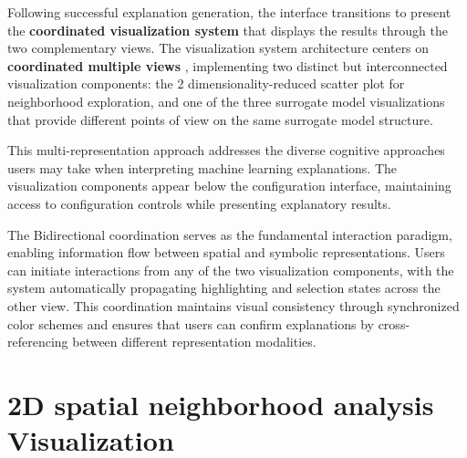 Following successful explanation generation, the interface transitions to present the \textbf{coordinated visualization system} that displays the results through the two complementary views. The visualization system architecture centers on \textbf{coordinated multiple views} \cite{readingsInformationVi}, implementing two distinct but interconnected visualization components: the 2 dimensionality-reduced scatter plot for neighborhood exploration, and one of the three surrogate model visualizations that provide different points of view on the same surrogate model structure.

This multi-representation approach addresses the diverse cognitive approaches users may take when interpreting machine learning explanations. The visualization components appear below the configuration interface, maintaining access to configuration controls while presenting explanatory results.

The Bidirectional coordination serves as the fundamental interaction paradigm, enabling information flow between spatial and symbolic representations. Users can initiate interactions from any of the two visualization components, with the system automatically propagating highlighting and selection states across the other view. This coordination maintains visual consistency through synchronized color schemes and ensures that users can confirm explanations by cross-referencing between different representation modalities.

\section{2D spatial neighborhood analysis Visualization}


